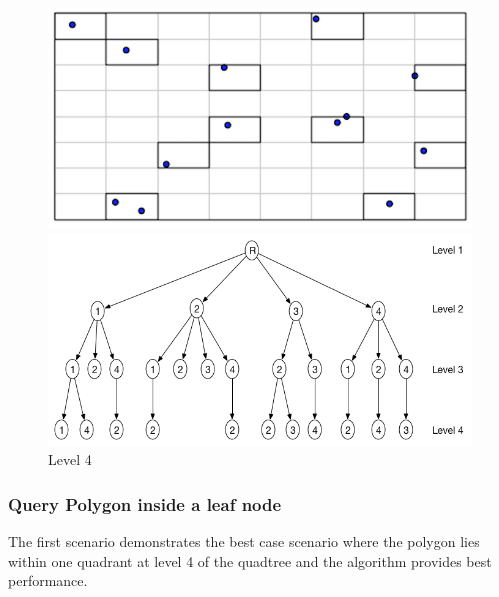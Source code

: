 \documentclass{article}
\begin{document}
\begin{figure}[ht]

  \centering
  \begin{minipage}[b]{0.35\textwidth}
    \includegraphics[width=\textwidth]{Quadtree_basic_scenario4}  
  \end{minipage}
  \hfill
  \begin{minipage}[b]{0.6\textwidth}
    \includegraphics[width=\textwidth]{1_1Quad_4_tree}
  \end{minipage}
  \caption{Level 4}
\end{figure}

\clearpage

\subsubsection{Query Polygon inside a leaf node}

\vspace{1cm}
The first scenario demonstrates the best case scenario where the polygon lies within one quadrant at level 4 of the quadtree and the algorithm provides best performance.
\end{document}
